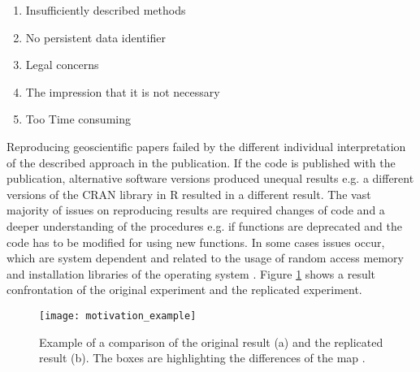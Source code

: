 \documentclass[draft,final]{vutinfth} %
\begin{document}
\begin{enumerate}
	\item Insufficiently described methods 
	\item No persistent data identifier
	\item Legal concerns
	\item The impression that it is not necessary
	\item Too Time consuming
\end{enumerate} 

Reproducing geoscientific papers failed by the different individual interpretation of the described approach in the publication. If the code is published with the publication, alternative software versions produced unequal results e.g. a different versions of the CRAN library in R resulted in a different result. The vast majority of issues on reproducing results are required changes of code and a deeper understanding of the procedures e.g. if functions are deprecated and the code has to be modified for using new functions. In some cases issues occur, which are system dependent and related to the usage of random access memory and installation libraries of the operating system \cite{Thestateofreproducibility}. Figure \ref{fig:motivation} shows a result confrontation of the original experiment and the replicated experiment.

\begin{figure}[h]
	\centering
	\texttt{[image: motivation\_example]}
	\caption{Example of a comparison of the original result (a) and the replicated result (b). The boxes are highlighting the differences of the map \cite{Thestateofreproducibility}.}
	\label{fig:motivation} %
\end{figure} 
\end{document}
